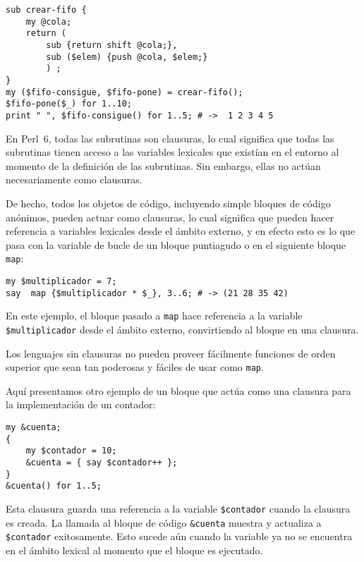 \begin{verbatim}
sub crear-fifo {
    my @cola;
    return (
        sub {return shift @cola;}, 
        sub ($elem) {push @cola, $elem;}
        ) ;
}
my ($fifo-consigue, $fifo-pone) = crear-fifo();
$fifo-pone($_) for 1..10;
print " ", $fifo-consigue() for 1..5; # ->  1 2 3 4 5
\end{verbatim}
%

En Perl~6, todas las subrutinas son clausuras, lo cual significa que 
todas las subrutinas tienen acceso a las variables lexicales que 
existían en el entorno al momento de la definición de las subrutinas.
Sin embargo, ellas no actúan necesariamente como clausuras.

De hecho, todos los objetos de código, incluyendo simple bloques de código anónimos,
pueden actuar como clausuras, lo cual significa que pueden 
hacer referencia a variables lexicales desde el ámbito externo,
y en efecto esto es lo que pasa con la variable de bucle de un
bloque puntiagudo o en el siguiente bloque {\tt map}:

\begin{verbatim}
my $multiplicador = 7;
say  map {$multiplicador * $_}, 3..6; # -> (21 28 35 42)
\end{verbatim}

En este ejemplo, el bloque pasado a \verb|map| hace referencia a
la variable \verb|$multiplicador| desde el ámbito externo, convirtiendo
al bloque en una clausura.


Los lenguajes sin clausuras no pueden proveer fácilmente
funciones de orden superior que sean tan poderosas y fáciles de usar
como {\tt map}.

Aquí presentamos otro ejemplo de un bloque que actúa como
una clausura para la implementación de un contador:

\begin{verbatim}
my &cuenta;
{
    my $contador = 10;
    &cuenta = { say $contador++ };
}
&cuenta() for 1..5;  
\end{verbatim}

Esta clausura guarda una referencia a la variable \verb|$contador|
cuando la clausura es creada. La llamada al bloque de código 
\verb|&cuenta| muestra y actualiza a \verb|$contador| exitosamente.
Esto sucede aún cuando la variable ya no se encuentra en el ámbito lexical
al momento que el bloque es ejecutado.

